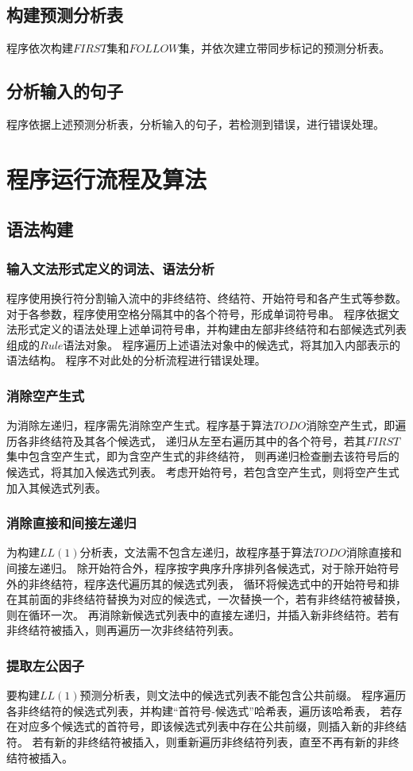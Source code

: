 \documentclass[UTF8]{ctexart}
\begin{document}
\subsection{构建预测分析表}
程序依次构建$FIRST$集和$FOLLOW$集，并依次建立带同步标记的预测分析表。
\subsection{分析输入的句子}
程序依据上述预测分析表，分析输入的句子，若检测到错误，进行错误处理。
\section{程序运行流程及算法}
\subsection{语法构建}
\subsubsection{输入文法形式定义的词法、语法分析}
程序使用换行符分割输入流中的非终结符、终结符、开始符号和各产生式等参数。对于各参数，程序使用空格分隔其中的各个符号，形成单词符号串。
程序依据文法形式定义的语法处理上述单词符号串，并构建由左部非终结符和右部候选式列表组成的$Rule$语法对象。
程序遍历上述语法对象中的候选式，将其加入内部表示的语法结构。
程序不对此处的分析流程进行错误处理。
\subsubsection{消除空产生式}
为消除左递归，程序需先消除空产生式。程序基于算法$TODO$消除空产生式，即遍历各非终结符及其各个候选式，
递归从左至右遍历其中的各个符号，若其$FIRST$集中包含空产生式，即为含空产生式的非终结符，
则再递归检查删去该符号后的候选式，将其加入候选式列表。
考虑开始符号，若包含空产生式，则将空产生式加入其候选式列表。
\subsubsection{消除直接和间接左递归}
为构建$LL(1)$分析表，文法需不包含左递归，故程序基于算法$TODO$消除直接和间接左递归。
除开始符合外，程序按字典序升序排列各候选式，对于除开始符号外的非终结符，程序迭代遍历其的候选式列表，
循环将候选式中的开始符号和排在其前面的非终结符替换为对应的候选式，一次替换一个，若有非终结符被替换，则在循环一次。
再消除新候选式列表中的直接左递归，并插入新非终结符。若有非终结符被插入，则再遍历一次非终结符列表。
\subsubsection{提取左公因子}
要构建$LL(1)$预测分析表，则文法中的候选式列表不能包含公共前缀。
程序遍历各非终结符的候选式列表，并构建“首符号-候选式”哈希表，遍历该哈希表，
若存在对应多个候选式的首符号，即该候选式列表中存在公共前缀，则插入新的非终结符。
若有新的非终结符被插入，则重新遍历非终结符列表，直至不再有新的非终结符被插入。
\end{document}
